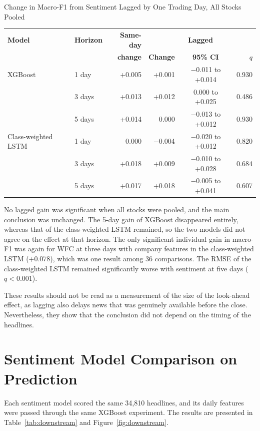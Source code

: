 \begin{utptable}{Change in Macro-F1 from Sentiment Lagged by One Trading Day, All Stocks Pooled}
\label{tab:lag-results}
\begin{tabular}{@{}llrrcr@{}}
\toprule
\textbf{Model} & \textbf{Horizon} & \textbf{Same-day} & \multicolumn{3}{c}{\textbf{Lagged}} \\
 & & \textbf{change} & \textbf{Change} & \textbf{95\% CI} & \textbf{$q$} \\
\midrule
XGBoost & 1 day & +0.005 & +0.001 & $-$0.011 to +0.014 & 0.930 \\
 & 3 days & +0.013 & +0.012 & 0.000 to +0.025 & 0.486 \\
 & 5 days & +0.014 & 0.000 & $-$0.013 to +0.012 & 0.930 \\
\midrule
Class-weighted LSTM & 1 day & 0.000 & $-$0.004 & $-$0.020 to +0.012 & 0.820 \\
 & 3 days & +0.018 & +0.009 & $-$0.010 to +0.028 & 0.684 \\
 & 5 days & +0.017 & +0.018 & $-$0.005 to +0.041 & 0.607 \\
\bottomrule
\end{tabular}
\end{utptable}

No lagged gain was significant when all stocks were pooled, and the main conclusion was unchanged. The 5-day gain of XGBoost disappeared entirely, whereas that of the class-weighted LSTM remained, so the two models did not agree on the effect at that horizon. The only significant individual gain in macro-F1 was again for WFC at three days with company features in the class-weighted LSTM (+0.078), which was one result among 36 comparisons. The RMSE of the class-weighted LSTM remained significantly worse with sentiment at five days ($q < 0.001$).

These results should not be read as a measurement of the size of the look-ahead effect, as lagging also delays news that was genuinely available before the close. Nevertheless, they show that the conclusion did not depend on the timing of the headlines.

\section{Sentiment Model Comparison on Prediction}
\label{sec:downstream-results}
Each sentiment model scored the same 34,810 headlines, and its daily features were passed through the same XGBoost experiment. The results are presented in Table~\ref{tab:downstream} and Figure~\ref{fig:downstream}.

